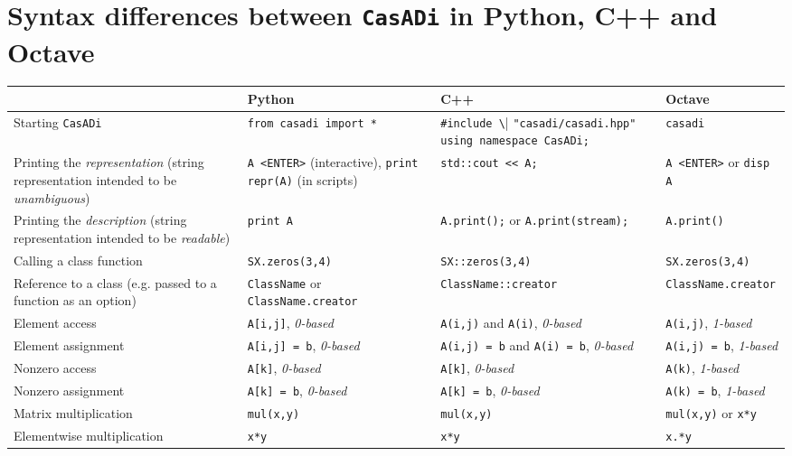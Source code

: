 \documentclass[a4paper,12pt]{book}
\newcommand{\CasADi}{\texttt{CasADi}\xspace}
\begin{document}
\chapter{Syntax differences between \CasADi in Python, C++ and Octave}\label{sec:syntax_differences}
\scriptsize
\begin{center}
  \begin{tabular}{| p{3.5cm} | p{3.5cm} | p{3.5cm} | p{3.5cm} | }
    \hline
      & Python & C++ & Octave \\ \hline
    Starting \CasADi & \verb|from casadi import *| & \verb|#include \| \verb|"casadi/casadi.hpp"| \verb|using namespace CasADi;| & \verb|casadi| \\ \hline
    Printing the \emph{representation} (string representation intended to be \emph{unambiguous}) & \verb|A <ENTER>| (interactive), \verb|print repr(A)| (in scripts) & \verb|std::cout << A;|& \verb|A <ENTER>| or \verb|disp A|\\ \hline
    Printing the \emph{description} (string representation intended to be \emph{readable}) & \verb|print A| & \verb|A.print();| or \verb|A.print(stream);|& \verb|A.print()| \\ \hline
    Calling a class function & \verb|SX.zeros(3,4)| & \verb|SX::zeros(3,4)| & \verb|SX.zeros(3,4)|\\ \hline
    Reference to a class (e.g. passed to a function as an option) & \verb|ClassName| or \verb|ClassName.creator| & \verb|ClassName::creator| & \verb|ClassName.creator|\\ \hline
    Element access & \verb|A[i,j]|, \emph{0-based} & \verb|A(i,j)| and \verb|A(i)|, \emph{0-based} & \verb|A(i,j)|, \emph{1-based} \\ \hline
    Element assignment & \verb|A[i,j] = b|, \emph{0-based} & \verb|A(i,j) = b| and \verb|A(i) = b|, \linebreak \emph{0-based} & \verb|A(i,j) = b|, \emph{1-based} \\ \hline
    Nonzero access & \verb|A[k]|, \emph{0-based} & \verb|A[k]|, \emph{0-based} & \verb|A(k)|, \emph{1-based} \\ \hline
    Nonzero assignment & \verb|A[k] = b|, \emph{0-based} & \verb|A[k] = b|, \emph{0-based} & \verb|A(k) = b|, \emph{1-based} \\ \hline
    Matrix multiplication & \verb|mul(x,y)| & \verb|mul(x,y)| & \verb|mul(x,y)| or \verb|x*y| \\ \hline
    Elementwise multiplication & \verb|x*y| & \verb|x*y| & \verb|x.*y| \\ \hline

\end{tabular}
\end{center}
\end{document}
